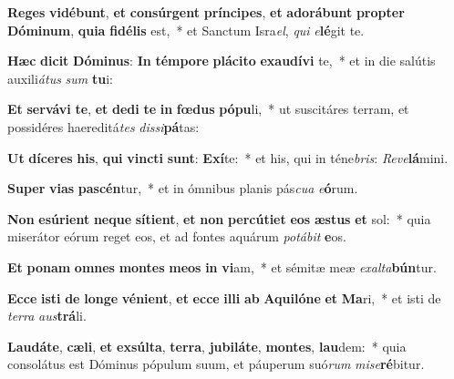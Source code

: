 \item \textbf{Re}\textbf{ges} \textbf{vi}\textbf{dé}\textbf{bunt}, \textbf{et} \textbf{con}\textbf{súr}\textbf{gent} \textbf{prín}\textbf{ci}\textbf{pes}, \textbf{et} \textbf{ad}\textbf{o}\textbf{rá}\textbf{bunt} \textbf{prop}\textbf{ter} \textbf{Dó}\textbf{mi}\textbf{num}, \textbf{qui}\textbf{a} \textbf{fi}\textbf{dé}\textbf{lis} est,~* et Sanctum Isra\textit{el}, \textit{qui} \textit{e}\textbf{lé}git te.
\item \textbf{Hæc} \textbf{di}\textbf{cit} \textbf{Dó}\textbf{mi}\textbf{nus}: \textbf{In} \textbf{tém}\textbf{po}\textbf{re} \textbf{plá}\textbf{ci}\textbf{to} \textbf{ex}\textbf{au}\textbf{dí}\textbf{vi} te,~* et in die salútis auxili\textit{á}\textit{tus} \textit{sum} \textbf{tu}i:
\item \textbf{Et} \textbf{ser}\textbf{vá}\textbf{vi} \textbf{te}, \textbf{et} \textbf{de}\textbf{di} \textbf{te} \textbf{in} \textbf{fœ}\textbf{dus} \textbf{pó}\textbf{pu}li,~* ut suscitáres terram, et possidéres haereditá\textit{tes} \textit{dis}\textit{si}\textbf{pá}tas:
\item \textbf{Ut} \textbf{dí}\textbf{ce}\textbf{res} \textbf{his}, \textbf{qui} \textbf{vinc}\textbf{ti} \textbf{sunt}: \textbf{Ex}\textbf{í}te:~* et his, qui in téne\textit{bris}: \textit{Re}\textit{ve}\textbf{lá}mini.
\item \textbf{Su}\textbf{per} \textbf{vi}\textbf{as} \textbf{pa}\textbf{scén}tur,~* et in ómnibus planis pás\textit{cu}\textit{a} \textit{e}\textbf{ó}rum.
\item \textbf{Non} \textbf{e}\textbf{sú}\textbf{ri}\textbf{ent} \textbf{ne}\textbf{que} \textbf{sí}\textbf{ti}\textbf{ent}, \textbf{et} \textbf{non} \textbf{per}\textbf{cú}\textbf{ti}\textbf{et} \textbf{e}\textbf{os} \textbf{æs}\textbf{tus} \textbf{et} sol:~* quia miserátor eórum reget eos, et ad fontes aquárum \textit{po}\textit{tá}\textit{bit} \textbf{e}os.
\item \textbf{Et} \textbf{po}\textbf{nam} \textbf{om}\textbf{nes} \textbf{mon}\textbf{tes} \textbf{me}\textbf{os} \textbf{in} \textbf{vi}am,~* et sémitæ meæ \textit{ex}\textit{al}\textit{ta}\textbf{bún}tur.
\item \textbf{Ec}\textbf{ce} \textbf{is}\textbf{ti} \textbf{de} \textbf{lon}\textbf{ge} \textbf{vé}\textbf{ni}\textbf{ent}, \textbf{et} \textbf{ec}\textbf{ce} \textbf{il}\textbf{li} \textbf{ab} \textbf{A}\textbf{qui}\textbf{ló}\textbf{ne} \textbf{et} \textbf{Ma}ri,~* et isti de \textit{ter}\textit{ra} \textit{aus}\textbf{trá}li.
\item \textbf{Lau}\textbf{dá}\textbf{te}, \textbf{cæ}\textbf{li}, \textbf{et} \textbf{ex}\textbf{súl}\textbf{ta}, \textbf{ter}\textbf{ra}, \textbf{ju}\textbf{bi}\textbf{lá}\textbf{te}, \textbf{mon}\textbf{tes}, \textbf{lau}dem:~* quia consolátus est Dóminus pópulum suum, et páuperum suó\textit{rum} \textit{mi}\textit{se}\textbf{ré}bitur.
